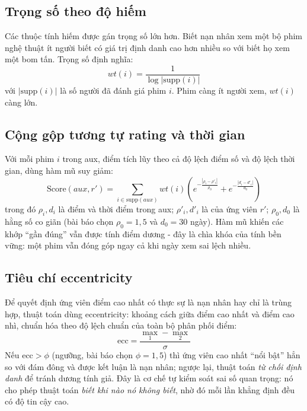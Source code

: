 \subsection{Trọng số theo độ hiếm}
Các thuộc tính hiếm được gán trọng số lớn hơn. Biết nạn nhân xem một bộ phim nghệ thuật ít người biết có giá trị định danh cao hơn nhiều so với biết họ xem một bom tấn. Trọng số định nghĩa:
\begin{equation}
	wt(i) = \frac{1}{\log |\mathrm{supp}(i)|}
	\label{eq:weight}
\end{equation}
với $|\mathrm{supp}(i)|$ là số người đã đánh giá phim $i$. Phim càng ít người xem, $wt(i)$ càng lớn.

\subsection{Cộng gộp tương tự rating và thời gian}
Với mỗi phim $i$ trong aux, điểm tích lũy theo cả độ lệch điểm số và độ lệch thời gian, dùng hàm mũ suy giảm:
\begin{equation}
	\mathrm{Score}(aux, r') = \sum_{i \in \mathrm{supp}(aux)} wt(i)\left( e^{-\frac{|\rho_i - \rho'_i|}{\rho_0}} + e^{-\frac{|d_i - d'_i|}{d_0}} \right)
	\label{eq:score}
\end{equation}
trong đó $\rho_i, d_i$ là điểm và thời điểm trong aux; $\rho'_i, d'_i$ là của ứng viên $r'$; $\rho_0, d_0$ là hằng số co giãn (bài báo chọn $\rho_0 = 1{,}5$ và $d_0 = 30$ ngày). Hàm mũ khiến các khớp ``gần đúng'' vẫn được tính điểm dương - đây là chìa khóa của tính bền vững: một phim vẫn đóng góp ngay cả khi ngày xem sai lệch nhiều.

\subsection{Tiêu chí eccentricity}
Để quyết định ứng viên điểm cao nhất có thực sự là nạn nhân hay chỉ là trùng hợp, thuật toán dùng eccentricity: khoảng cách giữa điểm cao nhất và điểm cao nhì, chuẩn hóa theo độ lệch chuẩn của toàn bộ phân phối điểm:
\begin{equation}
	\mathrm{ecc} = \frac{\max_1 - \max_2}{\sigma}
	\label{eq:ecc}
\end{equation}
Nếu $\mathrm{ecc} > \phi$ (ngưỡng, bài báo chọn $\phi = 1{,}5$) thì ứng viên cao nhất ``nổi bật'' hẳn so với đám đông và được kết luận là nạn nhân; ngược lại, thuật toán \textit{từ chối định danh} để tránh dương tính giả. Đây là cơ chế tự kiểm soát sai số quan trọng: nó cho phép thuật toán \textit{biết khi nào nó không biết}, nhờ đó mỗi lần khẳng định đều có độ tin cậy cao.

